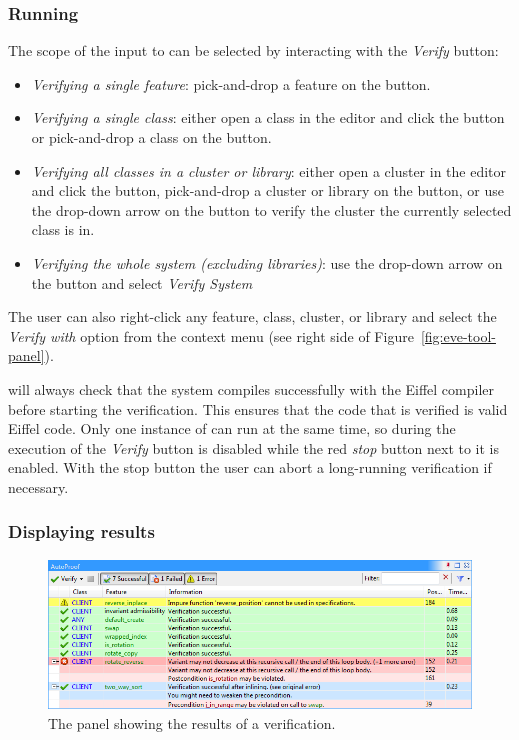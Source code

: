 \subsubsection{Running \AutoProof}

The scope of the input to \AutoProof can be selected by interacting with the \emph{Verify} button:
\begin{itemize}
\item \emph{Verifying a single feature}: pick-and-drop a feature on the button.
\item \emph{Verifying a single class}: either open a class in the editor and click the button or pick-and-drop a class on the button.
\item \emph{Verifying all classes in a cluster or library}: either open a cluster in the editor and click the button, pick-and-drop a cluster or library on the button, or use the drop-down arrow on the button to verify the cluster the currently selected class is in.
\item \emph{Verifying the whole system (excluding libraries)}: use the drop-down arrow on the button and select \emph{Verify System}
\end{itemize}

The user can also right-click any feature, class, cluster, or library and select the \emph{Verify with \AutoProof} option from the context menu (see right side of Figure~\ref{fig:eve-tool-panel}).

\AutoProof will always check that the system compiles successfully with the Eiffel compiler before starting the verification. This ensures that the code that is verified is valid Eiffel code. Only one instance of \AutoProof can run at the same time, so during the execution of \AutoProof the \emph{Verify} button is disabled while the red \emph{stop} button next to it is enabled. With the stop button the user can abort a long-running verification if necessary.



\subsubsection{Displaying results}

\begin{figure}
\centering
\includegraphics[width=\columnwidth]{images/eve_panel_results.png}
\caption{The \AutoProof panel showing the results of a verification.}
\label{fig:eve-tool-result}
\end{figure}


